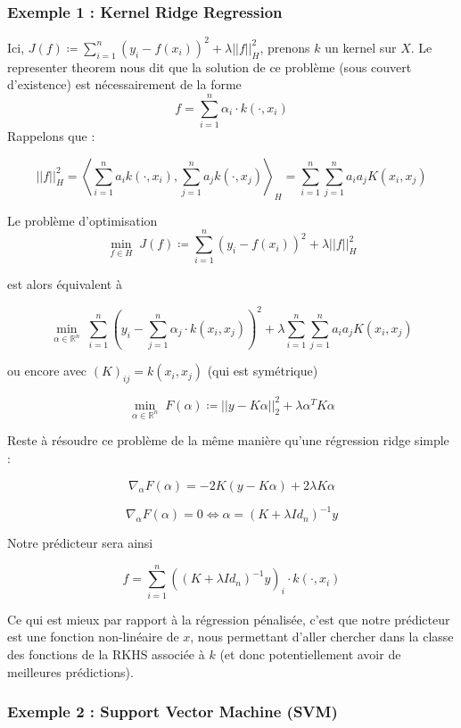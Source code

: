 \documentclass[a4paper, 11pt, french]{article}
\theoremstyle{definition}
\begin{document}
	\subsubsection{Exemple 1 : Kernel Ridge Regression}
	
	Ici, $J(f) \coloneqq \sum_{i=1}^{n} (y_i - f(x_i))^2 + \lambda ||f||_H^2$, prenons $k$ un kernel sur $X$. Le representer theorem nous dit que la solution de ce problème (sous couvert d'existence) est nécessairement de la forme 
	\[f = \sum_{i=1}^{n} \alpha_i \cdot k(\cdot, x_i)\]
	Rappelons que :
	
	\[||f||_H^2 = \left\langle \sum_{i=1}^{n} a_i k(\cdot, x_i), \sum_{j=1}^{n} a_j k(\cdot, x_j) \right\rangle_H = \sum_{i=1}^{n} \sum_{j=1}^{n} a_i a_j K(x_i, x_j)\]
	
	Le problème d'optimisation \[\min_{f \in H} \; J(f) \coloneqq \sum_{i=1}^{n} (y_i - f(x_i))^2 + \lambda ||f||_H^2\]
	
	est alors équivalent à 
	
	\[\min_{\alpha \in \mathbb{R}^n} \; \sum_{i=1}^{n} (y_i - \sum_{j=1}^{n} \alpha_j \cdot k(x_i, x_j))^2 + \lambda \sum_{i=1}^{n} \sum_{j=1}^{n} a_i a_j K(x_i, x_j)\]
	
	ou encore avec $(K)_{ij} = k(x_i, x_j)$ (qui est symétrique)
	
	\[\min_{\alpha \in \mathbb{R}^n} \; F(\alpha) \coloneqq ||y - K \alpha||_2^2 + \lambda \alpha^T K \alpha\]
	
	Reste à résoudre ce problème de la même manière qu'une régression ridge simple :
	
	\[\nabla_{\alpha} F(\alpha) = -2 K (y - K \alpha) + 2\lambda K \alpha\]
	
	\[\nabla_{\alpha} F(\alpha) = 0 \Leftrightarrow \alpha = (K + \lambda Id_n)^{-1} y\]
	
	Notre prédicteur sera ainsi
	
	\[f = \sum_{i=1}^{n} ((K + \lambda Id_n)^{-1} y)_i \cdot k(\cdot, x_i)\]
	
	Ce qui est mieux par rapport à la régression pénalisée, c'est que notre prédicteur est une fonction non-linéaire de $x$, nous permettant d'aller chercher dans la classe des fonctions de la RKHS associée à $k$ (et donc potentiellement avoir de meilleures prédictions).
	
	\subsubsection{Exemple 2 : Support Vector Machine (SVM)}	
	
\end{document}
